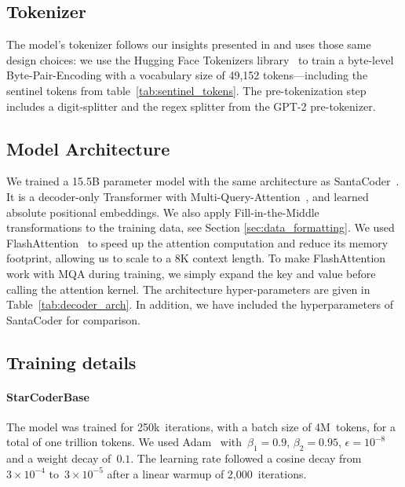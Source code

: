 \documentclass[10pt]{article} %
\begin{document}
\subsection{Tokenizer}\label{sec:tokenizer}
The model's tokenizer follows our insights presented in \citet{allal2023santacoder} and uses those same design choices: we use the Hugging Face Tokenizers library~\citep{anthony_moi_2022_hftokenizers} to train a byte-level Byte-Pair-Encoding with a vocabulary size of 49,152 tokens---including the sentinel tokens from table~\ref{tab:sentinel_tokens}. The pre-tokenization step includes a digit-splitter and the regex splitter from the GPT-2 pre-tokenizer.

\subsection{Model Architecture}\label{sec:model_architecture}
We trained a 15.5B parameter model with the same architecture as SantaCoder~\citep{allal2023santacoder}. It is a decoder-only Transformer with Multi-Query-Attention~\citep[MQA;][]{shazeer2019mqa}, and learned absolute positional embeddings. We also apply Fill-in-the-Middle~\citep[FIM;][]{bavarian2022fim} transformations to the training data, see Section \ref{sec:data_formatting}. We used FlashAttention~\citep{dao2022flashattention} to speed up the attention computation and reduce its memory footprint, allowing us to scale to a 8K context length. To make FlashAttention work with MQA during training, we simply expand the key and value before calling the attention kernel. The architecture hyper-parameters are given in Table~\ref{tab:decoder_arch}.  In addition, we have included the hyperparameters of SantaCoder\citep{allal2023santacoder} for comparison.  

\subsection{Training details}\label{sec:training_details}
\paragraph{StarCoderBase} The model was trained for 250k~iterations, with a batch size of 4M~tokens, for a total of one trillion tokens.  We used Adam~\citep{DBLP:journals/corr/KingmaB14} with~$\beta_1=0.9$, $\beta_2=0.95$, $\epsilon=10^{-8}$ and a weight decay of~$0.1$. The learning rate followed a cosine decay from~$3\times10^{-4}$ to~$3\times10^{-5}$ after a linear warmup of 2,000~iterations.
\end{document}
